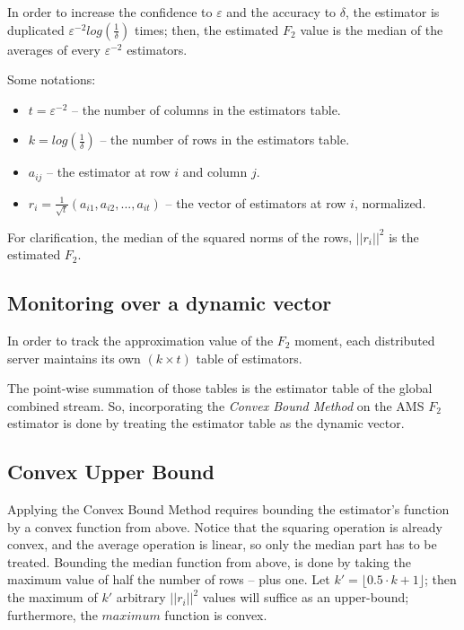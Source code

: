 \documentclass[11pt, conference]{IEEEtran}
\begin{document}
In order to increase the confidence to $\varepsilon$ and the accuracy to $\delta$, the estimator is duplicated ${\varepsilon ^{-2} log(\frac{1}{\delta})}$ times; then, the estimated $F_2$ value is the median of the averages of every $\varepsilon ^{-2}$ estimators.

Some notations: 
\begin{itemize}
	\item $t=\varepsilon ^{-2}$ -- the number of columns  in the estimators table.
	\item $k=log(\frac{1}{\delta})$ -- the number of rows in the estimators table.
	\item $a_{ij}$ -- the estimator at row $i$ and column $j$.
	\item $r_i = \frac{1}{\sqrt{t}} (a_{i1},a_{i2},...,a_{it})$ -- the vector of estimators at row $i$, normalized.
\end{itemize}

For clarification, the median of the squared norms of the rows, $||r_i||^2$ is the estimated $F_2$.


	\subsection{Monitoring over a dynamic vector}

In order to track the approximation value of the $F_2$ moment, each distributed server maintains its own ${(k \times t)}$ table of estimators.

The point-wise summation of those tables is the estimator table of the global combined stream. So, incorporating the \textit{Convex Bound Method} on the AMS $F_2$ estimator is done by treating the estimator table as the dynamic vector.

	\subsection{Convex Upper Bound}

Applying the Convex Bound Method requires bounding the estimator's function by a convex function from above. Notice that the squaring operation is already convex, and the average operation is linear, so only the median part has to be treated.
Bounding the median function from above, is done by taking the maximum value of half the number of rows -- plus one. Let $k' = {\lfloor 0.5 \cdot k  + 1\rfloor}$; then the maximum of $k'$ arbitrary $||r_i||^2$ values will suffice as an upper-bound; furthermore, the $maximum$ function is convex.
\end{document}
